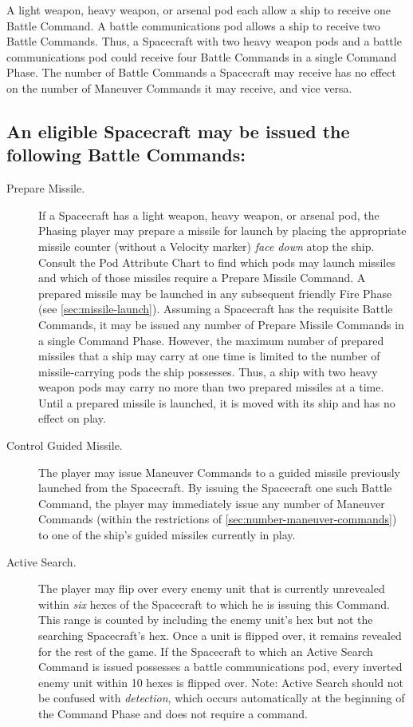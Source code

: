 A light weapon, heavy weapon, or arsenal pod each allow a ship to
receive one Battle Command. A battle communications pod allows a ship
to receive two Battle Commands. Thus, a Spacecraft with two heavy
weapon pods and a battle communications pod could receive four Battle
Commands in a single Command Phase. The number of Battle Commands a
Spacecraft may receive has no effect on the number of Maneuver
Commands it may receive, and vice versa.



\subsection[Battle Commands]{An eligible Spacecraft may be issued the
  following Battle 
  Commands:}
\label{sec:battle-commands}


\begin{description}
\item[Prepare Missile.] If a Spacecraft has a light weapon, heavy
weapon, or arsenal pod, the Phasing player may prepare a missile for
launch by placing the appropriate missile counter (without a Velocity
marker) \emph{face down} atop the ship. Consult the Pod Attribute
Chart to find which pods may launch missiles and which of those
missiles require a Prepare Missile Command. A prepared missile may be
launched in any subsequent friendly Fire Phase (see \ref{sec:missile-launch}).
Assuming a Spacecraft has the requisite Battle Commands, it may be
issued any number of Prepare Missile Commands in a single Command
Phase. However, the maximum number of prepared missiles that a ship
may carry at one time is limited to the number of missile-carrying
pods the ship possesses. Thus, a ship with two heavy weapon pods may
carry no more than two prepared missiles at a time. Until a prepared
missile is launched, it is moved with its ship and has no effect on
play.

\item[Control Guided Missile.] The player may issue Maneuver
Commands to a guided missile previously launched from the Spacecraft.
By issuing the Spacecraft one such Battle Command, the player may
immediately issue any number of Maneuver Commands (within the
restrictions of \ref{sec:number-maneuver-commands}) to one of the
ship's guided missiles currently in play.

\item[Active Search.] The player may flip over every enemy unit that
is currently unrevealed within \emph{six} hexes of the Spacecraft to
which he is issuing this Command. This range is counted by including
the enemy unit's hex but not the searching Spacecraft's hex. Once a
unit is flipped over, it remains revealed for the rest of the game. If
the Spacecraft to which an Active Search Command is issued possesses a
battle communications pod, every inverted enemy unit within 10 hexes
is flipped over. Note: Active Search should not be confused with
\emph{detection}, which occurs automatically at the beginning of the
Command Phase and does not require a command.


\end{description}
